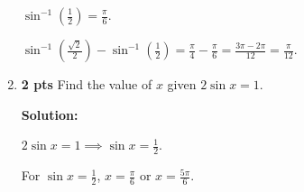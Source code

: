 \documentclass[nohyper,nobib,xcolor=dvipsnames,svgnames,x11names]{tufte-book}
\begin{document}
\begin{enumerate}
    $\sin^{-1}(\frac{1}{2}) = \frac{\pi}{6}$.
    
    $\sin^{-1}(\frac{\sqrt{2}}{2})-\sin^{-1}(\frac{1}{2}) = \frac{\pi}{4}-\frac{\pi}{6} = \frac{3\pi-2\pi}{12} = \frac{\pi}{12}$.

    \item \textbf{2 pts} Find the value of $x$ given $2\sin x=1$.
    
    \textbf{Solution:}
    
    $2\sin x=1 \implies \sin x = \frac{1}{2}$.
    
    For $\sin x = \frac{1}{2}$, $x = \frac{\pi}{6}$ or $x = \frac{5\pi}{6}$.

\end{enumerate}
\end{document}
